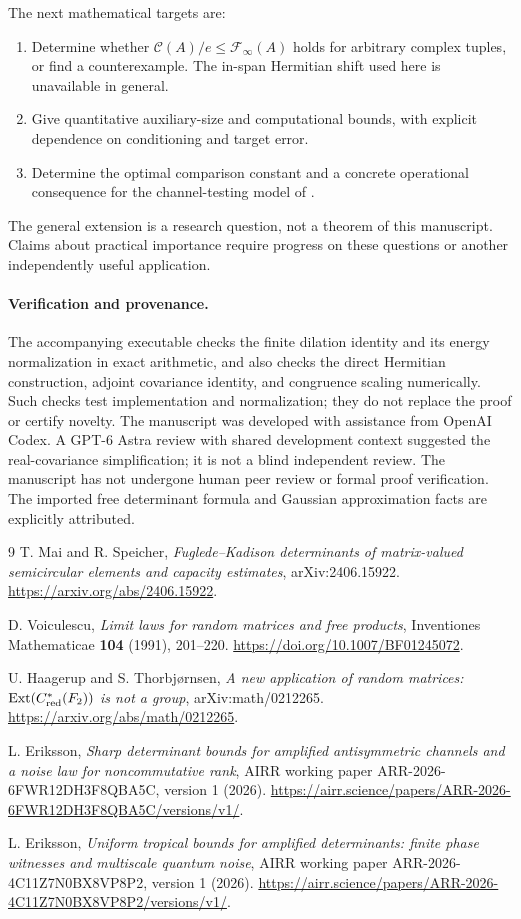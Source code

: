 \documentclass[11pt]{article}
\newcommand{\F}{\mathcal F}
\newcommand{\K}{\mathcal C}
\begin{document}
The next mathematical targets are:
\begin{enumerate}
 \item Determine whether $\K(A)/e\le\F_\infty(A)$ holds for arbitrary complex tuples, or find a counterexample. The in-span Hermitian shift used here is unavailable in general.
 \item Give quantitative auxiliary-size and computational bounds, with explicit dependence on conditioning and target error.
 \item Determine the optimal comparison constant and a concrete operational consequence for the channel-testing model of \cite{sharp}.
\end{enumerate}
The general extension is a research question, not a theorem of this manuscript. Claims about practical importance require progress on these questions or another independently useful application.

\paragraph{Verification and provenance.}
The accompanying executable checks the finite dilation identity and its energy normalization in exact arithmetic, and also checks the direct Hermitian construction, adjoint covariance identity, and congruence scaling numerically. Such checks test implementation and normalization; they do not replace the proof or certify novelty. The manuscript was developed with assistance from OpenAI Codex. A GPT-6 Astra review with shared development context suggested the real-covariance simplification; it is not a blind independent review. The manuscript has not undergone human peer review or formal proof verification. The imported free determinant formula and Gaussian approximation facts are explicitly attributed.

\begin{thebibliography}{9}
T. Mai and R. Speicher,
\emph{Fuglede--Kadison determinants of matrix-valued semicircular elements and capacity estimates},
arXiv:2406.15922.
\url{https://arxiv.org/abs/2406.15922}.

D. Voiculescu,
\emph{Limit laws for random matrices and free products},
Inventiones Mathematicae \textbf{104} (1991), 201--220.
\url{https://doi.org/10.1007/BF01245072}.

U. Haagerup and S. Thorbj{\o}rnsen,
\emph{A new application of random matrices: $\operatorname{Ext}(C^*_{\rm red}(F_2))$ is not a group},
arXiv:math/0212265.
\url{https://arxiv.org/abs/math/0212265}.

L. Eriksson,
\emph{Sharp determinant bounds for amplified antisymmetric channels and a noise law for noncommutative rank},
AIRR working paper ARR-2026-6FWR12DH3F8QBA5C, version 1 (2026).
\url{https://airr.science/papers/ARR-2026-6FWR12DH3F8QBA5C/versions/v1/}.

L. Eriksson,
\emph{Uniform tropical bounds for amplified determinants: finite phase witnesses and multiscale quantum noise},
AIRR working paper ARR-2026-4C11Z7N0BX8VP8P2, version 1 (2026).
\url{https://airr.science/papers/ARR-2026-4C11Z7N0BX8VP8P2/versions/v1/}.
\end{thebibliography}
\end{document}
